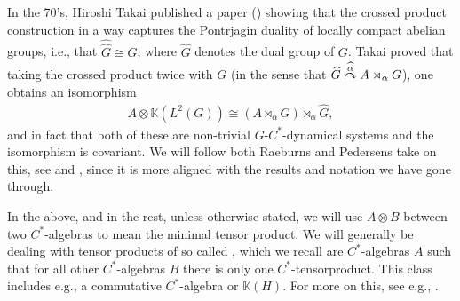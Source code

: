In the 70's, Hiroshi Takai published a paper (\cite{takai1975duality}) showing that the crossed product construction in a way captures the Pontrjagin duality of locally compact abelian groups, i.e., that $\hat{\hat G} \cong G$, where $\hat G$ denotes the dual group of $G$. Takai proved that taking the crossed product twice with $G$ (in the sense that $\widehat{G} \stackrel{\widehat{\alpha}}{\curvearrowright} A \rtimes_\alpha G$), one obtains an isomorphism 
\begin{align}
	A \otimes \mathbb{K}(L^2(G))  \cong  (A \rtimes_\alpha G) \rtimes_{\hat \alpha}  \hat G,
	\label{eqisotoshow}
\end{align}
and in fact that both of these are non-trivial $G$-$C^*$-dynamical systems and the isomorphism is covariant. We will follow both Raeburns and Pedersens take on this, see \cite{raeburn1988crossed} and \cite[Chapter 7.9]{pedersenalgauto}, since it is more aligned with the results and notation we have gone through.
\begin{note}
	In the above, and in the rest, unless otherwise stated, we will use $A \otimes B$ between two $C^*$-algebras to mean the minimal tensor product. We will generally be dealing with tensor products of so called , which we recall are $C^*$-algebras $A$ such that for all other $C^*$-algebras $B$ there is only one $C^*$-tensorproduct. This class includes e.g., a commutative $C^*$-algebra or $\mathbb{K}(H)$. For more on this, see e.g., \cite{brown2008c}.
\end{note}

